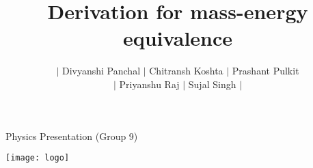 \documentclass[11pt]{beamer}
\title{Derivation for mass-energy equivalence}
\author[Divyanshi, Chitransh, Prashant...]
{\(|\) Divyanshi Panchal \(|\) Chitransh Koshta \(|\) Prashant Pulkit \\\(|\) Priyanshu Raj \(|\) Sujal Singh \(|\)}
\date[Priyanshu, Sujal]{}
\begin{document}
    \begin{frame}{Physics Presentation (Group 9)}
        \begin{center}
            \texttt{[image: logo]}
        \end{center}\vspace*{-18pt}
        \maketitle
    \end{frame}
\end{document}
